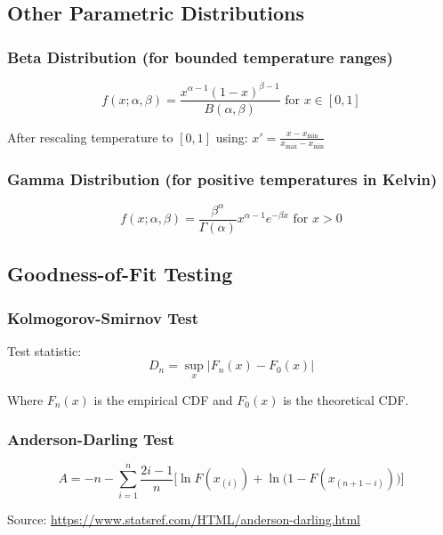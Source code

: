 \documentclass[12pt, xcolor=dvipsnames,svgnames,x11names]{article}
\begin{document}
\subsection{Other Parametric Distributions}

\subsubsection{Beta Distribution (for bounded temperature ranges)}
\begin{equation}
f(x; \alpha, \beta) = \frac{x^{\alpha-1}(1-x)^{\beta-1}}{B(\alpha,\beta)} \text{ for } x \in [0,1]
\end{equation}

After rescaling temperature to $[0,1]$ using: $x' = \frac{x - x_{\min}}{x_{\max} - x_{\min}}$

\subsubsection{Gamma Distribution (for positive temperatures in Kelvin)}
\begin{equation}
f(x; \alpha, \beta) = \frac{\beta^\alpha}{\Gamma(\alpha)} x^{\alpha-1} e^{-\beta x} \text{ for } x > 0
\end{equation}

\subsection{Goodness-of-Fit Testing}

\subsubsection{Kolmogorov-Smirnov Test}
Test statistic: 
\begin{equation}
D_n = \sup_x|F_n(x) - F_0(x)|
\end{equation}

Where $F_n(x)$ is the empirical CDF and $F_0(x)$ is the theoretical CDF.

\subsubsection{Anderson-Darling Test}
\begin{equation}
A  = -n - \sum_{i=1}^n \frac{2i-1}{n}\bigg[ \ln F(x_{(i)}) + \ln \bigg( 1-  F(x_{(n+1-i)}) \bigg) \bigg]
\end{equation}

Source: \url{https://www.statsref.com/HTML/anderson-darling.html}
\end{document}
